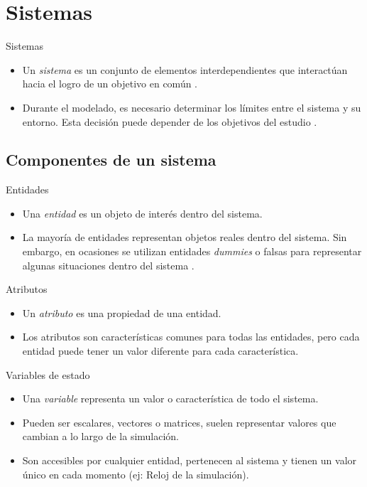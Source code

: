 \section{Sistemas}

\begin{frame}{Sistemas}
    \begin{itemize}
        \item Un \textit{sistema} es un conjunto de elementos interdependientes que interactúan hacia el logro de un objetivo en común \cite{LK}.
        \item Durante el modelado, es necesario determinar los límites entre el sistema y su entorno. Esta decisión puede depender de los objetivos del estudio \cite{LK}.
        
    \end{itemize}
\end{frame}

\subsection{Componentes de un sistema}

\begin{frame}{Entidades}
    \begin{itemize}
        \item Una \textit{entidad} es un objeto de interés dentro del sistema.
        \item La mayoría de entidades representan objetos reales dentro del sistema. Sin embargo, en ocasiones se utilizan entidades \textit{dummies} o falsas para representar algunas situaciones dentro del sistema \cite{KSS}.
    \end{itemize}
\end{frame}

\begin{frame}{Atributos}
    \begin{itemize}
        \item Un \textit{atributo} es una propiedad de una entidad.
        \item Los atributos son características comunes para todas las entidades, pero cada entidad puede tener un valor diferente para cada característica.
    \end{itemize}
\end{frame}

\begin{frame}{Variables de estado}
    \begin{itemize}
        \item Una \textit{variable} representa un valor o característica de todo el sistema.

        \item Pueden ser escalares, vectores o matrices, suelen representar valores que cambian a lo largo de la simulación.
        
        \item Son accesibles por cualquier entidad, pertenecen al sistema y tienen un valor único en cada momento (ej: Reloj de la simulación).
    \end{itemize}
\end{frame}

